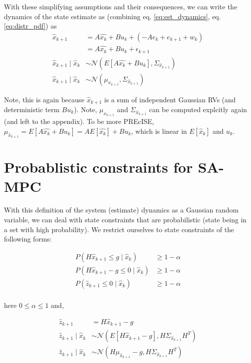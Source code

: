 \documentclass{article}[14pt]
\begin{document}
	With these simplifying assumptions and their consequences, we can write the dynamics of the state estimate as (combining eq. \ref{eq:est_dynamics}, eq. \ref{eq:distr_pdf}) as
	\begin{subequations}
		\begin{align}
			\hat{x}_{k+1} &= A\hat{x_k}+ Bu_k + (-Ae_{k}+e_{k+1}+w_k) \nonumber \\
									 &= A\hat{x_k}+ Bu_k + \epsilon_{k+1} \nonumber \\
			\hat{x}_{k+1}\mid\hat{x}_k &\sim \mathcal{N}(E[A\hat{x_k}+Bu_k], \Sigma_{\hat{x}_{k+1}}) \nonumber \\
			\hat{x}_{k+1}\mid\hat{x}_k &\sim \mathcal{N}(\mu_{x_{k+1}}, \Sigma_{\hat{x}_{k+1}})						
		\end{align}
	\end{subequations}

	Note, this is again because $\hat{x}_{k+1}$ is a sum of independent Gaussian RVs (and deterministic term $Bu_k$). Note, $\mu_{x_{k+1}}$ and $\Sigma_{\hat{x}_{k+1}}$ can be computed explcitly again (and left to the appendix). To be more PREcISE, $\mu_{\hat{x}_{k+1}} = E[A\hat{x_k}+Bu_k] = AE[\hat{x_k}]+Bu_k$, which is linear in $E[\hat{x}_k]$ and $u_k$.

	\section{Probablistic constraints for SA-MPC}
	With this definition of the system (estimate) dynamics as a Gaussian random variable, we can deal with state constraints that are probabilistic (state being in a set with high probability). We restrict ourselves to state constraints of the following forms:

	\begin{subequations}
		\begin{align}
			P(H\hat{x}_{k+1}\leq g\mid\hat{x}_k ) &\geq 1-\alpha \nonumber \\
			P(H\hat{x}_{k+1}-g\leq 0\mid\hat{x}_k) &\geq 1-\alpha \nonumber \\
			P(\hat{z}_{k+1}\leq0\mid\hat{x}_k) &\geq 1-\alpha \nonumber \\
		\end{align}
		\label{eq:constraint_form}	
	\end{subequations}

	here $0\leq\alpha\leq1$ and, 

	\begin{subequations}
		\begin{align}
			\hat{z}_{k+1} &= H\hat{x}_{k+1}-g \nonumber \\
			\hat{z}_{k+1}\mid\hat{x}_k &\sim \mathcal{N}(E[H\hat{x}_{k+1}-g],H\Sigma_{\hat{x}_{k+1}}H^{T}) \nonumber \\
			\hat{z}_{k+1}\mid\hat{x}_k &\sim \mathcal{N}(H\mu_{\hat{x}_{k+1}}-g,H\Sigma_{\hat{x}_{k+1}}H^{T})
		\end{align}
		\label{eq:pdf_constraint}
	\end{subequations}
\end{document}
